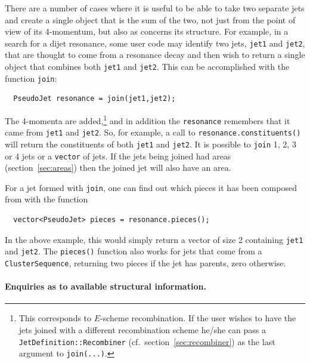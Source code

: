 \documentclass[12pt,a4]{article}
\newcommand{\ttt}[1]{{\small\texttt{#1}}}
\newcommand{\CS}{\ttt{ClusterSequence}\xspace}
\begin{document}
There are a number of cases where it is useful to be able to take two
separate jets and create a single object that is the sum of the two,
not just from the point of view of its 4-momentum, but also as
concerns its structure.
%
For example, in a search for a dijet resonance, some user code may
identify two jets, \ttt{jet1} and \ttt{jet2}, that are thought to come
from a resonance decay and then wish to return a single object that
combines both \ttt{jet1} and \ttt{jet2}.
%
This can be accomplished with the function \ttt{join}:
%
\begin{lstlisting}
  PseudoJet resonance = join(jet1,jet2); 
\end{lstlisting}
The 4-momenta are added,\footnote{This corresponds to $E$-scheme
  recombination. If the user wishes to have the jets joined with a
  different recombination scheme he/she can pass a
  \texttt{JetDefinition::Recombiner} (cf.\ section~\ref{sec:recombiner})
  as the last argument to \texttt{join(...)}.} and in addition the
\ttt{resonance} remembers that it came from \ttt{jet1} and
\ttt{jet2}. So, for example, a call to \ttt{resonance.constituents()}
will return the constituents of both \ttt{jet1} and \ttt{jet2}.
%
It is possible to \ttt{join} 1, 2, 3 or 4 jets or a \ttt{vector} of
jets.
%
If the jets being joined had areas (section~\ref{sec:areas}) then the
joined jet will also have an area.



For a jet formed with \ttt{join}, one can find out which pieces it has
been composed from with the function
\begin{lstlisting}
  vector<PseudoJet> pieces = resonance.pieces();
\end{lstlisting}
In the above example, this would simply return a vector of size 2
containing \ttt{jet1} and \ttt{jet2}.
%
The \ttt{pieces()} function also works for jets that come from a \CS,
returning two pieces if the jet has parents, zero otherwise.



\paragraph{Enquiries as to available structural information.}
\end{document}
